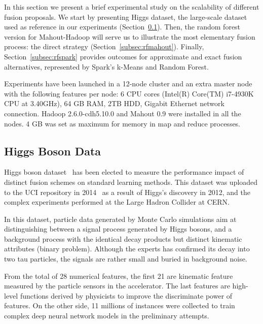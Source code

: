 \documentclass[3p,review]{elsarticle}
\begin{document}
In this section we present a brief experimental study on the scalability of different fusion proposals. We start by presenting Higgs dataset, the large-scale dataset used as reference in our experiments (Section~\ref{subsec:datasets}). Then, the random forest version for Mahout-Hadoop will serve us to illustrate the most elementary fusion process: the direct strategy (Section~\ref{subsec:rfmahout}). Finally, Section~\ref{subsec:rfspark} provides outcomes for approximate and exact fusion alternatives, represented by Spark's k-Means and Random Forest.

Experiments have been launched in a 12-node cluster and an extra master node with the following features per node: 6 CPU cores (Intel(R) Core(TM) i7-4930K CPU at 3.40GHz), 64 GB RAM, 2TB HDD, Gigabit Ethernet network connection. Hadoop 2.6.0-cdh5.10.0 and Mahout 0.9 were installed in all the nodes. 4 GB was set as maximum for memory in map and reduce processes.

\subsection{Higgs Boson Data}
\label{subsec:datasets}

Higgs boson dataset~\cite{baldi14} has been elected to measure the performance impact of distinct fusion schemes on standard learning methods. This dataset was uploaded to the UCI repository in 2014~\cite{Lichman:2013} as a result of Higgs's discovery in 2012, and the complex experiments performed at the Large Hadron Collider at CERN. %

In this dataset, particle data generated by Monte Carlo simulations aim at distinguishing between a signal process generated by Higgs bosons, and a background process with the identical decay products but distinct kinematic attributes (binary problem). Although the experts has confirmed its decay into two tau particles, the signals are rather small and buried in background noise. 

From the total of 28 numerical features, the first 21 are kinematic feature measured by the particle sensors in the accelerator. The last features are high-level functions derived by physicists to improve the discriminate power of features. On the other side, 11 millions of instances were collected to train complex deep neural network models in the preliminary attempts.
\end{document}
